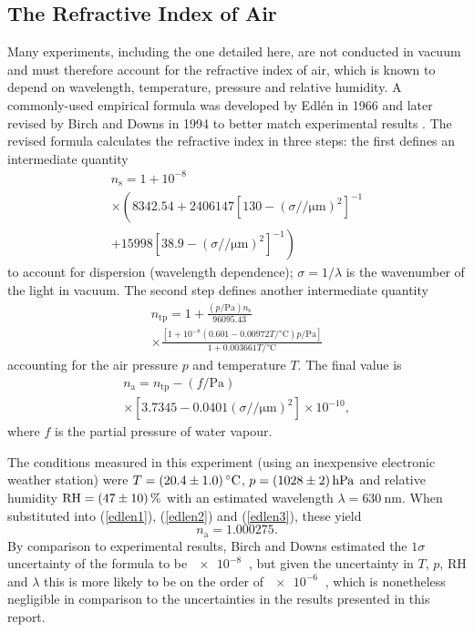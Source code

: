 \documentclass[
    aps,
    prl,
    reprint,
    10pt,
    amsmath,
    amssymb,
    a4paper,
    longbibliography
]{revtex4-2}
\begin{document}
\subsection{The Refractive Index of Air}
Many experiments, including the one detailed here, are not conducted in
vacuum and must therefore account for the refractive index of air, which
is known to depend on wavelength, temperature, pressure and relative
humidity. A commonly-used empirical formula was developed by Edl{\'e}n
in 1966 and later revised by Birch and Downs in 1994 to better match
experimental results \cite{birchdowns}. The revised formula calculates
the refractive index in three steps: the first defines an intermediate
quantity
\begin{multline}
    n_\mathrm{s} = 1 + 10^{-8} \\
    \times \left(
        8342.54
        + 2406147 \left[
            130 - \left(\sigma / \si{\per\micro\meter}\right)^2
        \right]^{-1} \right. \\
        \left. + 15998 \left [
            38.9 - \left(\sigma / \si{\per\micro\meter}\right)^2
        \right]^{-1}
    \right)
    \label{edlen1}
\end{multline}
to account for dispersion (wavelength dependence);
$\sigma = 1/\lambda$ is the
wavenumber of the light in vacuum. The second step defines another
intermediate quantity
\begin{multline}
    n_\mathrm{tp} = 1 + \frac{(p / \si{\pascal})n_\mathrm{s}}{96095.43} \\
    \times \frac{
        \left[
            1 + 10^{-8} (0.601 - 0.00972 T / \si{\celsius})p / \si{\pascal}
        \right]
    }{
        1 + 0.003661 T / \si{\celsius}
    }
    \label{edlen2}
\end{multline}
accounting for the air pressure $p$ and temperature $T$. The final value
is
\begin{multline}
    n_\mathrm{a} = n_\mathrm{tp} - (f/\si{\pascal}) \\
    \times \left [
            3.7345 - 0.0401 \left(\sigma / \si{\per\micro\meter}\right)^2
    \right] \times 10^{-10},
    \label{edlen3}
\end{multline}
where $f$ is the partial pressure of water vapour.

The conditions measured in this experiment (using an inexpensive electronic
weather station) were
$T = \SI{20.4 \pm 1}{\celsius}$,
$p = \SI{1028 \pm 2}{\hecto\pascal}$ and
relative humidity $\mathrm{RH} = \SI{47 \pm 10}{\percent}$
with an estimated wavelength $\lambda = \SI{630}{\nano\meter}$. When
substituted into (\ref{edlen1}), (\ref{edlen2}) and (\ref{edlen3}),
these yield
\begin{equation}
    n_\mathrm{a} = 1.000275.
    \label{n_air_edlen}
\end{equation}
By comparison to experimental results, Birch and Downs
estimated the $1\sigma$ uncertainty of the formula to be $\SI{e-8}
{}$ \cite{birchdowns}, but given the uncertainty in $T$, $p$, $\mathrm
{RH}$ and $\lambda$ this is more likely to be on the order of $\SI
{e-6}{}$ \cite{emtoolbox}, which is nonetheless negligible in
comparison to the uncertainties in the results presented in this
report.
\end{document}
